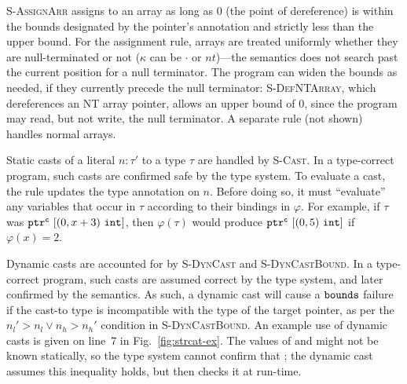 
\textsc{S-AssignArr} assigns to an array as long as 0 (the point of
dereference) is within the bounds designated by the pointer's annotation
and strictly less than the upper bound. For the assignment rule,
arrays are treated uniformly whether they are null-terminated or not
($\kappa$ can be $\cdot$ or $nt$)---the semantics does not search past
the current position for a null terminator. The program
can widen the bounds as needed, if they currently precede the null
terminator: \textsc{S-DefNTArray}, which dereferences an NT array
pointer, allows an upper bound of $0$, since the program may read, but
not write, the null terminator. A separate rule (not shown) handles
normal arrays.

%
Static casts of a literal $n\!:\!\tau'$ to a type $\tau$ are handled
by \textsc{S-Cast}. In a type-correct program, such casts are
confirmed safe by the type system. To evaluate a cast, the rule
updates the type annotation on $n$. Before doing so, it must
``evaluate'' any variables that occur in $\tau$ according to their
bindings in $\varphi$. For example, if $\tau$ was
${\mathtt{ptr}^{\texttt{c}}~{[{({0},{x+3})}~{\mathtt{int}}]}}$, then $\varphi(\tau)$ would
produce ${\mathtt{ptr}^{\texttt{c}}~{[{({0},{5})}~{\mathtt{int}}]}}$ if $\varphi(x) = 2$.

Dynamic casts are accounted for by \textsc{S-DynCast} and
\textsc{S-DynCastBound}. In a type-correct program, such casts are
assumed correct by the type system, and later confirmed by the
semantics. As such, a dynamic cast will cause a $\mathtt{bounds}$ failure if
the cast-to type is incompatible with the type of the target pointer,
as per the $n_l' > n_l \vee n_h > n_h'$ condition in
\textsc{S-DynCastBound}. An example use of dynamic casts is given on
line~7 in Fig.~\ref{fig:strcat-ex}. The values of  and
 might not be known statically, so the type system cannot
confirm that ; the dynamic cast assumes this inequality
holds, but then checks it at run-time.

